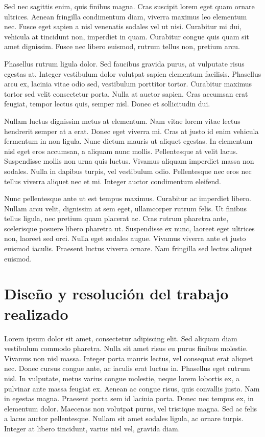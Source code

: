 Sed nec sagittis enim, quis finibus magna. Cras suscipit lorem eget quam ornare ultrices. Aenean fringilla condimentum diam, viverra maximus leo elementum nec. Fusce eget sapien a nisl venenatis sodales vel ut nisi. Curabitur mi dui, vehicula at tincidunt non, imperdiet in quam. Curabitur congue quis quam sit amet dignissim. Fusce nec libero euismod, rutrum tellus non, pretium arcu.

Phasellus rutrum ligula dolor. Sed faucibus gravida purus, at vulputate risus egestas at. Integer vestibulum dolor volutpat sapien elementum facilisis. Phasellus arcu ex, lacinia vitae odio sed, vestibulum porttitor tortor. Curabitur maximus tortor sed velit consectetur porta. Nulla at auctor sapien. Cras accumsan erat feugiat, tempor lectus quis, semper nisl. Donec et sollicitudin dui.

Nullam luctus dignissim metus at elementum. Nam vitae lorem vitae lectus hendrerit semper at a erat. Donec eget viverra mi. Cras at justo id enim vehicula fermentum in non ligula. Nunc dictum mauris ut aliquet egestas. In elementum nisl eget eros accumsan, a aliquam nunc mollis. Pellentesque at velit lacus. Suspendisse mollis non urna quis luctus. Vivamus aliquam imperdiet massa non sodales. Nulla in dapibus turpis, vel vestibulum odio. Pellentesque nec eros nec tellus viverra aliquet nec et mi. Integer auctor condimentum eleifend.

Nunc pellentesque ante ut est tempus maximus. Curabitur ac imperdiet libero. Nullam arcu velit, dignissim at sem eget, ullamcorper rutrum felis. Ut finibus tellus ligula, nec pretium quam placerat ac. Cras rutrum pharetra ante, scelerisque posuere libero pharetra ut. Suspendisse ex nunc, laoreet eget ultrices non, laoreet sed orci. Nulla eget sodales augue. Vivamus viverra ante et justo euismod iaculis. Praesent luctus viverra ornare. Nam fringilla sed lectus aliquet euismod.

\chapter{Diseño y resolución del trabajo realizado}

Lorem ipsum dolor sit amet, consectetur adipiscing elit. Sed aliquam diam vestibulum commodo pharetra. Nulla sit amet risus eu purus finibus molestie. Vivamus non nisl massa. Integer porta mauris lectus, vel consequat erat aliquet nec. Donec cursus congue ante, ac iaculis erat luctus in. Phasellus eget rutrum nisl. In vulputate, metus varius congue molestie, neque lorem lobortis ex, a pulvinar ante massa feugiat ex. Aenean ac congue risus, quis convallis justo. Nam in egestas magna. Praesent porta sem id lacinia porta. Donec nec tempus ex, in elementum dolor. Maecenas non volutpat purus, vel tristique magna. Sed ac felis a lacus auctor pellentesque. Nullam sit amet sodales ligula, ac ornare turpis. Integer at libero tincidunt, varius nisl vel, gravida diam.

